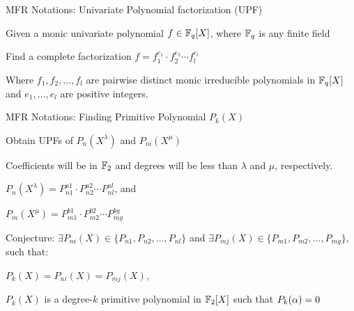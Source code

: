 \begin{frame}{\large MFR Notations: Univariate Polynomial factorization (UPF) }
\bi
	\item Given a monic univariate polynomial $f \in {\mathbb{F}}_q[X]$, where ${\mathbb{F}}_q$ is any finite field
	\vspace{0.1in}
	\bi 
		\item Find a complete factorization $f = f_1^{e_1}\cdot f_2^{e_2}\cdots f_l^{e_l}$ 
		\bi
			\item Where $f_1, f_2,\dots, f_l$ are pairwise distinct monic 
			irreducible polynomials in ${\mathbb{F}}_q[X]$ and $e_1,\dots,e_l$ are positive integers.
		\ei
	\ei
	\vspace{0.1in}
\ei
\end{frame}

\begin{frame}{\large MFR Notations: Finding Primitive Polynomial $P_k(X)$}
\bi
	\item Obtain UPFs of $P_n(X^{\lambda})$ and $P_m(X^{\mu})$
	\bi
		\item Coefficients will be in ${\mathbb{F}}_{2}$ and degrees will be less than $\lambda$ and $\mu$, respectively.
		\bi
			\item $P_n(X^{\lambda})=P_{n1}^{a1}\cdot P_{n2}^{a2}\cdots P_{nl}^{al}$, and 
			\item $P_m(X^{\mu}) = P_{m1}^{b1}\cdot P_{m2}^{b2}\cdots P_{mg}^{bg}$
		\ei
	\ei
	\vspace{0.1in}
	\item Conjecture: $\exists P_{ni}(X) \in \{P_{n1}, P_{n2},\dots ,P_{nl}\}$ and $\exists P_{mj}(X) \in \{P_{m1}, P_{m2},\dots ,P_{mg}\}$, such that:
	\bi
		\item $P_k(X) = P_{ni}(X)=P_{mj}(X)$,
		\item $P_{k}(X)$ is a degree-$k$ primitive polynomial in ${\mathbb{F}}_2[X]$ such that $P_k(\alpha)=0$
	\ei
\ei
\end{frame}


